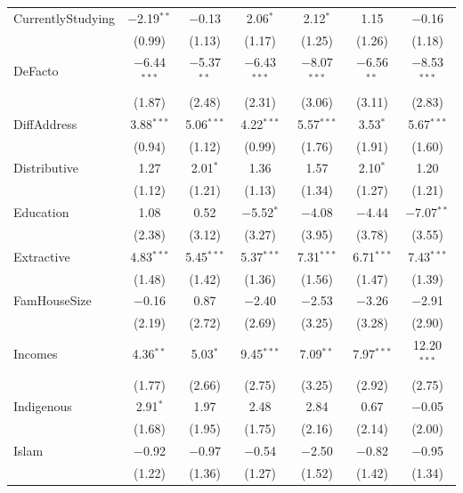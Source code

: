 \documentclass[11pt,a4paper,]{article}
\begin{document}
\begin{table}[!htbp]
\begin{tabular}{@{\extracolsep{1pt}}lcccccc}
 CurrentlyStudying & $-$2.19$^{**}$ & $-$0.13 & 2.06$^{*}$ & 2.12$^{*}$ & 1.15 & $-$0.16 \\
  & (0.99) & (1.13) & (1.17) & (1.25) & (1.26) & (1.18) \\

 DeFacto & $-$6.44$^{***}$ & $-$5.37$^{**}$ & $-$6.43$^{***}$ & $-$8.07$^{***}$ & $-$6.56$^{**}$ & $-$8.53$^{***}$ \\
  & (1.87) & (2.48) & (2.31) & (3.06) & (3.11) & (2.83) \\

 DiffAddress & 3.88$^{***}$ & 5.06$^{***}$ & 4.22$^{***}$ & 5.57$^{***}$ & 3.53$^{*}$ & 5.67$^{***}$ \\
  & (0.94) & (1.12) & (0.99) & (1.76) & (1.91) & (1.60) \\

 Distributive & 1.27 & 2.01$^{*}$ & 1.36 & 1.57 & 2.10$^{*}$ & 1.20 \\
  & (1.12) & (1.21) & (1.13) & (1.34) & (1.27) & (1.21) \\

 Education & 1.08 & 0.52 & $-$5.52$^{*}$ & $-$4.08 & $-$4.44 & $-$7.07$^{**}$ \\
  & (2.38) & (3.12) & (3.27) & (3.95) & (3.78) & (3.55) \\

 Extractive & 4.83$^{***}$ & 5.45$^{***}$ & 5.37$^{***}$ & 7.31$^{***}$ & 6.71$^{***}$ & 7.43$^{***}$ \\
  & (1.48) & (1.42) & (1.36) & (1.56) & (1.47) & (1.39) \\

 FamHouseSize & $-$0.16 & 0.87 & $-$2.40 & $-$2.53 & $-$3.26 & $-$2.91 \\
  & (2.19) & (2.72) & (2.69) & (3.25) & (3.28) & (2.90) \\

 Incomes & 4.36$^{**}$ & 5.03$^{*}$ & 9.45$^{***}$ & 7.09$^{**}$ & 7.97$^{***}$ & 12.20$^{***}$ \\
  & (1.77) & (2.66) & (2.75) & (3.25) & (2.92) & (2.75) \\

 Indigenous & 2.91$^{*}$ & 1.97 & 2.48 & 2.84 & 0.67 & $-$0.05 \\
  & (1.68) & (1.95) & (1.75) & (2.16) & (2.14) & (2.00) \\

 Islam & $-$0.92 & $-$0.97 & $-$0.54 & $-$2.50 & $-$0.82 & $-$0.95 \\
  & (1.22) & (1.36) & (1.27) & (1.52) & (1.42) & (1.34) \\


\end{tabular}
\end{table}
\end{document}
